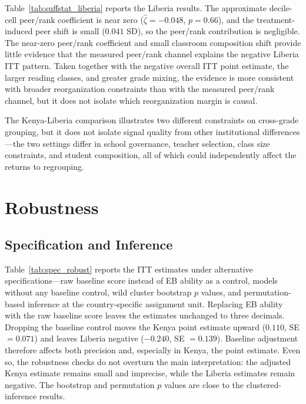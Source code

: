 \documentclass[11pt]{article}
\begin{document}
Table~\ref{tab:suffstat_liberia} reports the Liberia results. The approximate decile-cell peer/rank coefficient is near zero ($\hat{\zeta} = -0.048$, $p = 0.66$), and the treatment-induced peer shift is small ($0.041$ SD), so the peer/rank contribution is negligible. The near-zero peer/rank coefficient and small classroom composition shift provide little evidence that the measured peer/rank channel explains the negative Liberia ITT pattern. Taken together with the negative overall ITT point estimate, the larger reading classes, and greater grade mixing, the evidence is more consistent with broader reorganization constraints than with the measured peer/rank channel, but it does not isolate which reorganization margin is causal.

The Kenya-Liberia comparison illustrates two different constraints on cross-grade grouping, but it does not isolate signal quality from other institutional differences---the two settings differ in school governance, teacher selection, class size constraints, and student composition, all of which could independently affect the returns to regrouping.

\section{Robustness}
\label{sec:robustness}

\subsection{Specification and Inference}

Table~\ref{tab:spec_robust} reports the ITT estimates under alternative specifications---raw baseline score instead of EB ability as a control, models without any baseline control, wild cluster bootstrap $p$ values, and permutation-based inference at the country-specific assignment unit. Replacing EB ability with the raw baseline score leaves the estimates unchanged to three decimals. Dropping the baseline control moves the Kenya point estimate upward ($0.110$, SE $=0.071$) and leaves Liberia negative ($-0.240$, SE $=0.139$). Baseline adjustment therefore affects both precision and, especially in Kenya, the point estimate. Even so, the robustness checks do not overturn the main interpretation: the adjusted Kenya estimate remains small and imprecise, while the Liberia estimates remain negative. The bootstrap and permutation $p$ values are close to the clustered-inference results.
\end{document}

